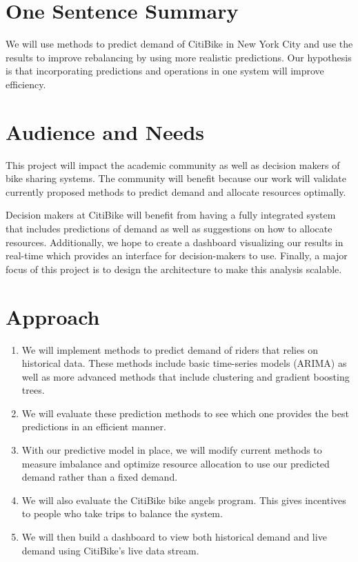\documentclass{proc}
\begin{document}
\section{One Sentence Summary}


We will use methods to predict demand of CitiBike in New York City and use the results to improve rebalancing by using more realistic predictions. Our hypothesis is that incorporating predictions and operations in one system will improve efficiency. 

\section{Audience and Needs}

This project will impact the academic community as well as decision makers of bike sharing systems. The community will benefit because our work will validate currently proposed methods to predict demand and allocate resources optimally. 

Decision makers at CitiBike will benefit from having a fully integrated system that includes predictions of demand as well as suggestions on how to allocate resources. Additionally, we hope to create a dashboard visualizing our results in real-time which provides an interface for decision-makers to use. Finally, a major focus of this project is to design the architecture to make this analysis scalable. 

\section{Approach}

\begin{enumerate}
\item We will implement methods to predict demand of riders that relies on historical data. These methods include basic time-series models (ARIMA) as well as more advanced methods that include clustering and gradient boosting trees. 
\item We will evaluate these prediction methods to see which one provides the best predictions in an efficient manner.
\item With our predictive model in place, we will modify current methods to measure imbalance and optimize resource allocation to use our predicted demand rather than a fixed demand. 
\item We will also evaluate the CitiBike bike angels program. This gives incentives to people who take trips to balance the system. 
\item We will then build a dashboard to view both historical demand and live demand using CitiBike's live data stream.
\end{enumerate}
\end{document}
